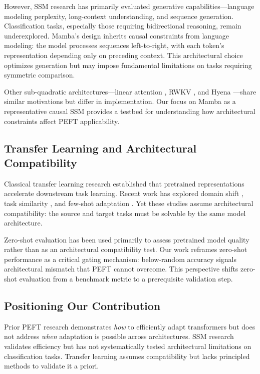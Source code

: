 However, SSM research has primarily evaluated generative capabilities---language modeling perplexity, long-context understanding, and sequence generation. Classification tasks, especially those requiring bidirectional reasoning, remain underexplored. Mamba's design inherits causal constraints from language modeling: the model processes sequences left-to-right, with each token's representation depending only on preceding context. This architectural choice optimizes generation but may impose fundamental limitations on tasks requiring symmetric comparison.

Other sub-quadratic architectures---linear attention \cite{katharopoulos2020transformers}, RWKV \cite{peng2023rwkv}, and Hyena \cite{poli2023hyena}---share similar motivations but differ in implementation. Our focus on Mamba as a representative causal SSM provides a testbed for understanding how architectural constraints affect PEFT applicability.

\subsection{Transfer Learning and Architectural Compatibility}

Classical transfer learning research \cite{pan2010survey,yosinski2014transferable} established that pretrained representations accelerate downstream task learning. Recent work has explored domain shift \cite{ganin2016domain}, task similarity \cite{zamir2018taskonomy}, and few-shot adaptation \cite{brown2020language}. Yet these studies assume architectural compatibility: the source and target tasks must be solvable by the same model architecture.

Zero-shot evaluation has been used primarily to assess pretrained model quality \cite{radford2019language} rather than as an architectural compatibility test. Our work reframes zero-shot performance as a critical gating mechanism: below-random accuracy signals architectural mismatch that PEFT cannot overcome. This perspective shifts zero-shot evaluation from a benchmark metric to a prerequisite validation step.

\subsection{Positioning Our Contribution}

Prior PEFT research demonstrates \textit{how} to efficiently adapt transformers but does not address \textit{when} adaptation is possible across architectures. SSM research validates efficiency but has not systematically tested architectural limitations on classification tasks. Transfer learning assumes compatibility but lacks principled methods to validate it a priori.

